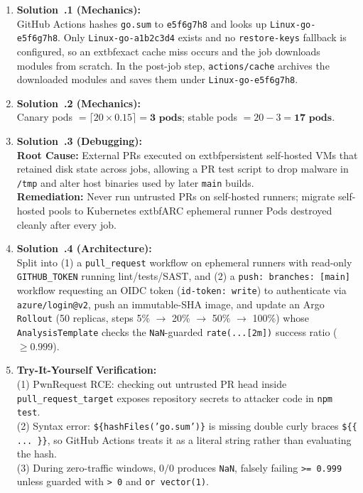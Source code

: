 \begin{enumerate}[leftmargin=18pt]
  \item \textbf{Solution~\thechapter.1 (Mechanics):}\\
  GitHub Actions hashes \texttt{go.sum} to \texttt{e5f6g7h8} and looks up \texttt{Linux-go-e5f6g7h8}. Only \texttt{Linux-go-a1b2c3d4} exists and no \texttt{restore-keys} fallback is configured, so an 	extbf{exact cache miss} occurs and the job downloads modules from scratch. In the post-job step, \texttt{actions/cache} archives the downloaded modules and saves them under \texttt{Linux-go-e5f6g7h8}.

  \item \textbf{Solution~\thechapter.2 (Mechanics):}\\
  Canary pods $= \lceil 20 \times 0.15 \rceil = \mathbf{3\text{ pods}}$; stable pods $= 20 - 3 = \mathbf{17\text{ pods}}$.

  \item \textbf{Solution~\thechapter.3 (Debugging):}\\
  \textbf{Root Cause:} External PRs executed on 	extbf{persistent} self-hosted VMs that retained disk state across jobs, allowing a PR test script to drop malware in \texttt{/tmp} and alter host binaries used by later \texttt{main} builds.\\
  \textbf{Remediation:} Never run untrusted PRs on self-hosted runners; migrate self-hosted pools to Kubernetes 	extbf{ARC ephemeral runner Pods} destroyed cleanly after every job.

  \item \textbf{Solution~\thechapter.4 (Architecture):}\\
  Split into (1) a \texttt{pull\_request} workflow on ephemeral runners with read-only \texttt{GITHUB\_TOKEN} running lint/tests/SAST, and (2) a \texttt{push: branches: [main]} workflow requesting an OIDC token (\texttt{id-token: write}) to authenticate via \texttt{azure/login@v2}, push an immutable-SHA image, and update an Argo \texttt{Rollout} (50 replicas, steps 5\% $\to$ 20\% $\to$ 50\% $\to$ 100\%) whose \texttt{AnalysisTemplate} checks the \texttt{NaN}-guarded \texttt{rate(...[2m])} success ratio ($\ge 0.999$).

  \item \textbf{Try-It-Yourself Verification:}\\
  (1) PwnRequest RCE: checking out untrusted PR head inside \texttt{pull\_request\_target} exposes repository secrets to attacker code in \texttt{npm test}.\\
  (2) Syntax error: \texttt{\$\{hashFiles('go.sum')\}} is missing double curly braces \texttt{\$\{\{ ... \}\}}, so GitHub Actions treats it as a literal string rather than evaluating the hash.\\
  (3) During zero-traffic windows, $0/0$ produces \texttt{NaN}, falsely failing \texttt{>= 0.999} unless guarded with \texttt{> 0} and \texttt{or vector(1)}.
\end{enumerate}

